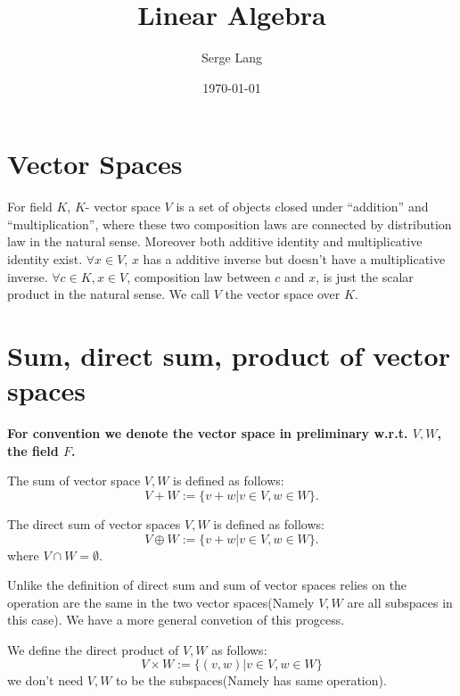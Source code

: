 \documentclass[11pt]{article}
\author{Serge Lang}
\date{\today}
\title{\elzevier Linear Algebra}
\begin{document}
\maketitle
\tableofcontents

\section{Vector Spaces}
\label{sec:orgd4bc571}
\begin{definition}
For field \(K\), \(K\)- vector space \(V\) is a set of objects closed under ``addition'' and ``multiplication'', where these two composition laws are connected by distribution law in the natural sense. Moreover both additive identity and multiplicative identity exist. \(\forall x \in V\), \(x\) has a additive inverse but doesn't have a multiplicative inverse. \(\forall c \in K, x \in V\), composition law between \(c\) and \(x\), is just the scalar product in the natural sense. We call \(V\) the vector space over \(K\).
\end{definition}
\section{Sum, direct sum, product of vector spaces}
\label{sec:orgeac55d5}
\textbf{For convention we denote the vector space in preliminary w.r.t. \(V,W\), the field \(F\).}

\begin{definition}
The sum of vector space \(V,W\) is defined as follows:
\[
V + W := \{v + w\vert v\in V, w\in W\}.
\]
\end{definition}

\begin{definition}
The direct sum of vector spaces \(V,W\) is defined as follows:
\[
V \oplus W := \{v + w\vert v\in V, w\in W\}.
\]
where \(V \cap W = \emptyset\).
\end{definition}

Unlike the definition of direct sum and sum of vector spaces relies on the operation are the same in the two vector spaces(Namely \(V,W\) are all subspaces in this case). We have a more general convetion of this progcess.

\begin{definition}
We define the direct product of \(V,W\) as follows:
\[
V \times W := \{(v,w)\vert v\in V, w\in W\}
\]
we don't need \(V,W\) to be the subspaces(Namely has same operation).
\end{definition}
\end{document}
